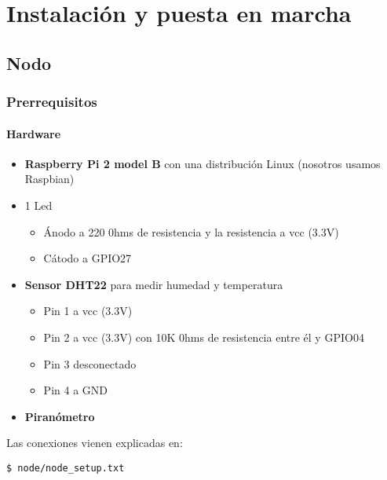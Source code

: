 \cleardoublepage

\chapter{Instalación y puesta en marcha}
\label{makereference5}

\section{Nodo}
\label{makereference5.1}
\subsection{Prerrequisitos}
\label{makereference5.1.2}
\subsubsection{Hardware}
\label{makereference5.1.3}
	\begin{itemize}
		\item \textbf{Raspberry Pi 2 model B} con una distribución Linux (nosotros usamos Raspbian)
		\item 1 Led
			\begin{itemize}
				\item Ánodo a 220 0hms de resistencia y la resistencia a vcc (3.3V)
				\item Cátodo a GPIO27
			\end{itemize}
		\item \textbf{Sensor DHT22} para medir humedad y temperatura
			\begin{itemize}
				\item Pin 1 a vcc (3.3V)
				\item Pin 2 a vcc (3.3V) con 10K 0hms de resistencia entre él y GPIO04
				\item Pin 3 desconectado
				\item Pin 4 a GND
			\end{itemize}
		\item \textbf{Piranómetro}
	\end{itemize}

	Las conexiones vienen explicadas en:
\lstset{language=bash}
\begin{lstlisting}[frame=single]
$ node/node_setup.txt
\end{lstlisting}


